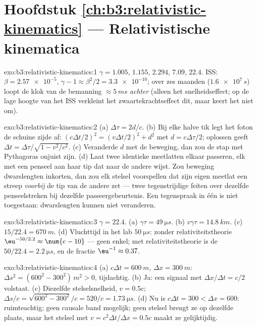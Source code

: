 \section*{Hoofdstuk \ref{ch:b3:relativistic-kinematics} --- Relativistische kinematica}

\begin{solution}{exo:b3:relativistic-kinematics:1}
$\gamma = 1.005$, $1.155$, $2.294$, $7.09$, $22.4$. ISS: $\beta =
\num{2.57e-5}$, $\gamma - 1 \approx \beta^2/2 = \num{3.3e-10}$; over
zes maanden ($\num{1.6e7}{}\,\unit{s}$) loopt de klok van de bemanning
$\approx\qty{5}{ms}$ \emph{achter} (alleen het snelheidseffect; op de
lage hoogte van het ISS verkleint het zwaartekrachtseffect dit, maar
keert het niet om).
\end{solution}

\begin{solution}{exo:b3:relativistic-kinematics:2}
(a) $\Delta\tau = 2d/c$. (b) Bij elke halve tik legt het foton de
schuine zijde af: $(c\Delta t/2)^2 = (v\Delta t/2)^2 + d^2$ met $d =
c\Delta\tau/2$; oplossen geeft $\Delta t = \Delta\tau/\sqrt{1 - v^2/c^2}$. (c) Veranderde $d$ met de beweging, dan zou de stap met
Pythagoras onjuist zijn. (d) Laat twee identieke meetlatten elkaar
passeren, elk met een penseel aan haar tip dat naar de andere wijst.
Zou beweging dwarslengten inkorten, dan zou elk stelsel voorspellen dat
zijn eigen meetlat een streep \emph{voorbij} de tip van de andere zet
--- twee tegenstrijdige feiten over dezelfde penseelstreken bij dezelfde
passeergebeurtenis. Een tegenspraak in één  is niet
toegestaan: dwarslengten kunnen niet veranderen.
\end{solution}

\begin{solution}{exo:b3:relativistic-kinematics:3}
$\gamma = 22.4$. (a) $\gamma\tau = \qty{49}{\micro s}$. (b) $v\gamma
\tau = \qty{14.8}{km}$. (c) $15/22.4 = \qty{670}{m}$. (d) Vluchttijd in
het lab $\qty{50}{\micro s}$: zonder relativiteitstheorie
$\eu^{-50/2.2} \approx \num{e-10}$ --- geen enkel; met
relativiteitstheorie is de  $50/22.4 = \qty{2.2}{\micro s}$, en
de fractie $\eu^{-1}
\approx 0.37$.
\end{solution}

\begin{solution}{exo:b3:relativistic-kinematics:4}
(a) $c\Delta t = \qty{600}{m}$, $\Delta x = \qty{300}{m}$: $\Delta s^2
= (600^2 - 300^2)\,\unit{m^2} > 0$, tijdachtig. (b) Ja: een signaal met
$\Delta x/\Delta t = c/2$ volstaat. (c) Diezelfde stelselsnelheid, $v =
0.5c$;  $\Delta s/c = \sqrt{600^2 - 300^2}/c = 520/c =
\qty{1.73}{\micro s}$. (d) Nu is $c\Delta t = 300 < \Delta x = 600$:
ruimteachtig; geen causale band mogelijk; geen stelsel brengt ze op
dezelfde plaats, maar het stelsel met $v = c^2\Delta t/\Delta x = 0.5c$
maakt ze gelijktijdig.
\end{solution}

